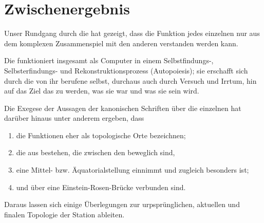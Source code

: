 \section{Zwischenergebnis}%

Unser Rundgang durch die  hat gezeigt, dass die Funktion jedes einzelnen  nur aus dem komplexen Zusammenspiel mit den anderen  verstanden werden kann. 


Die  funktioniert insgesamt als Computer in einem Selbst\-fin\-dungs-, Selbst\-er\-fin\-dungs- und Rekonstruktionsprozess (Autopoiesis); sie erschafft sich durch die von ihr berufene  selbst, durchaus auch durch Versuch und Irrtum, hin auf das Ziel das zu werden, was sie war und was sie sein wird. 



Die Exegese der Aussagen der kanonischen Schriften über die einzelnen  hat darüber hinaus unter anderem ergeben, dass 
\begin{enumerate}
    \item die  Funktionen eher als topologische Orte bezeichnen;
    \item die  aus  bestehen, die  zwischen den  beweglich sind,
    \item {} eine Mittel- bzw. Äquatorialstellung einnimmt und zugleich besonders  ist;
    \item {} und  über eine Einstein-Rosen-Brücke verbunden sind.
\end{enumerate}

Daraus lassen sich einige Überlegungen zur urpsprünglichen, aktuellen und finalen Topologie der Station ableiten.

